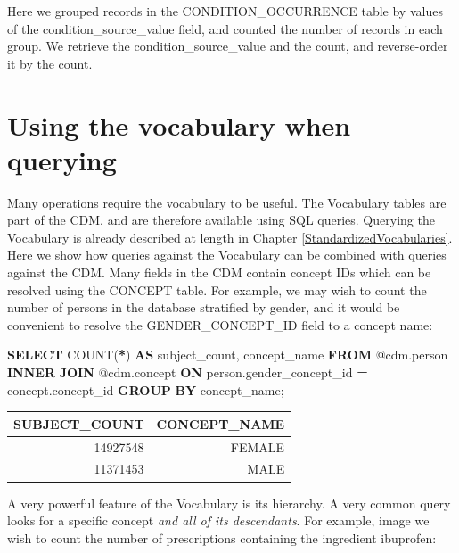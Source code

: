\documentclass[11pt]{book}
\newenvironment{Shaded}{\begin{snugshade}}{\end{snugshade}}
\newcommand{\FunctionTok}[1]{\textcolor[rgb]{0.00,0.00,0.00}{#1}}
\newcommand{\KeywordTok}[1]{\textcolor[rgb]{0.13,0.29,0.53}{\textbf{#1}}}
\newcommand{\NormalTok}[1]{#1}
\newcommand{\OperatorTok}[1]{\textcolor[rgb]{0.81,0.36,0.00}{\textbf{#1}}}
\theoremstyle{definition}
\theoremstyle{definition}
\theoremstyle{definition}
\theoremstyle{remark}
\begin{document}
Here we grouped records in the CONDITION\_OCCURRENCE table by values of the condition\_source\_value field, and counted the number of records in each group. We retrieve the condition\_source\_value and the count, and reverse-order it by the count.

\hypertarget{using-the-vocabulary-when-querying}{%
\section{Using the vocabulary when querying}\label{using-the-vocabulary-when-querying}}

Many operations require the vocabulary to be useful. The Vocabulary tables are part of the CDM, and are therefore available using SQL queries. Querying the Vocabulary is already described at length in Chapter \ref{StandardizedVocabularies}. Here we show how queries against the Vocabulary can be combined with queries against the CDM. Many fields in the CDM contain concept IDs which can be resolved using the CONCEPT table. For example, we may wish to count the number of persons in the database stratified by gender, and it would be convenient to resolve the GENDER\_CONCEPT\_ID field to a concept name:

\begin{Shaded}
\begin{Highlighting}[]
\KeywordTok{SELECT} \FunctionTok{COUNT}\NormalTok{(}\OperatorTok{*}\NormalTok{) }\KeywordTok{AS}\NormalTok{ subject_count,}
\NormalTok{  concept_name}
\KeywordTok{FROM}\NormalTok{ @cdm.person}
\KeywordTok{INNER} \KeywordTok{JOIN}\NormalTok{ @cdm.concept}
  \KeywordTok{ON}\NormalTok{ person.gender_concept_id }\OperatorTok{=}\NormalTok{ concept.concept_id}
\KeywordTok{GROUP} \KeywordTok{BY}\NormalTok{ concept_name;}
\end{Highlighting}
\end{Shaded}

\begin{longtable}[]{@{}rr@{}}
\toprule
SUBJECT\_COUNT & CONCEPT\_NAME\tabularnewline
\midrule
\endhead
14927548 & FEMALE\tabularnewline
11371453 & MALE\tabularnewline
\bottomrule
\end{longtable}

A very powerful feature of the Vocabulary is its hierarchy. A very common query looks for a specific concept \emph{and all of its descendants}. For example, image we wish to count the number of prescriptions containing the ingredient ibuprofen:
\end{document}
